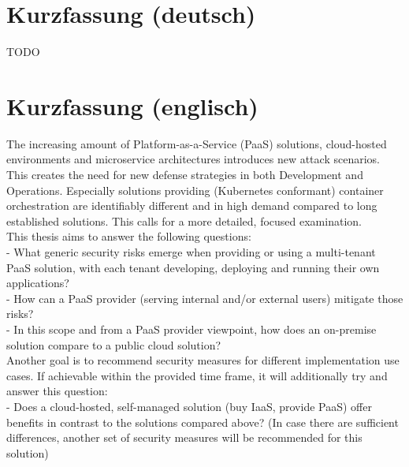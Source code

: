 \chapter*{Kurzfassung (deutsch)}
\thispagestyle{empty}

TODO

\chapter*{Kurzfassung (englisch)}
\thispagestyle{empty}

The increasing amount of Platform-as-a-Service (PaaS) solutions, cloud-hosted environments and
microservice architectures introduces new attack scenarios. This creates the need for new defense
strategies in both Development and Operations. Especially solutions providing (Kubernetes
conformant) container orchestration are identifiably different and in high demand compared to long
established solutions. This calls for a more detailed, focused examination. \\
This thesis aims to answer the following questions: \\

- What generic security risks emerge when providing or using a multi-tenant PaaS solution,
with each tenant developing, deploying and running their own applications? \\

- How can a PaaS provider (serving internal and/or external users) mitigate those risks? \\

-  In this scope and from a PaaS provider viewpoint, how does an on-premise solution compare
to a public cloud solution? \\

Another goal is to recommend security measures for different implementation use cases.
If achievable within the provided time frame, it will additionally try and answer this question: \\

- Does a cloud-hosted, self-managed solution (buy IaaS, provide PaaS) offer benefits in
contrast to the solutions compared above?
(In case there are sufficient differences, another set of security measures will be
recommended for this solution) \\

